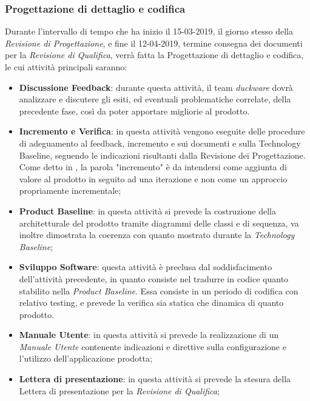 \subsubsection{Progettazione di dettaglio e codifica}
Durante l'intervallo di tempo che ha inizio il 15-03-2019, il giorno stesso della \emph{Revisione di Progettazione}, e fine il 12-04-2019, termine consegna dei documenti per la \emph{Revisione di Qualifica}, verrà fatta la Progettazione di dettaglio e codifica, le cui attività principali saranno:
	\begin{itemize}
		\item \textbf{Discussione Feedback}: durante questa attività, il team \emph{duckware} dovrà analizzare e discutere gli esiti, ed eventuali problematiche correlate, della precedente fase, così da poter apportare migliorie al prodotto.
		\item \textbf{Incremento e Verifica}: in questa attività vengono eseguite delle procedure di adeguamento al feedback, incremento e  sui documenti e sulla Technology Baseline, seguendo le indicazioni risultanti dalla Revisione dei Progettazione. Come detto in , la parola "incremento" è da intendersi come aggiunta di valore al prodotto in seguito ad una iterazione e non come un approccio propriamente incrementale;
		\item \textbf{Product Baseline}: in questa attività si prevede la costruzione della  architetturale del prodotto tramite diagrammi delle classi e di sequenza, va inoltre dimostrata la coerenza con quanto mostrato durante la \emph{Technology Baseline};
		\item \textbf{Sviluppo Software}: questa attività è preclusa dal soddisfacimento dell'attività precedente, in quanto consiste nel tradurre in codice quanto stabilito nella \emph{Product Baseline}. Essa consiste in un periodo di codifica con relativo testing, e prevede la verifica sia statica che dinamica di quanto prodotto.
		\item \textbf{Manuale Utente}: in questa attività si prevede la realizzazione di un \emph{Manuale Utente} contenente indicazioni e direttive sulla configurazione e l'utilizzo dell'applicazione prodotta;
		\item \textbf{Lettera di presentazione}: in questa attività si prevede la stesura della Lettera di presentazione per la \emph{Revisione di Qualifica};
	\end{itemize}
